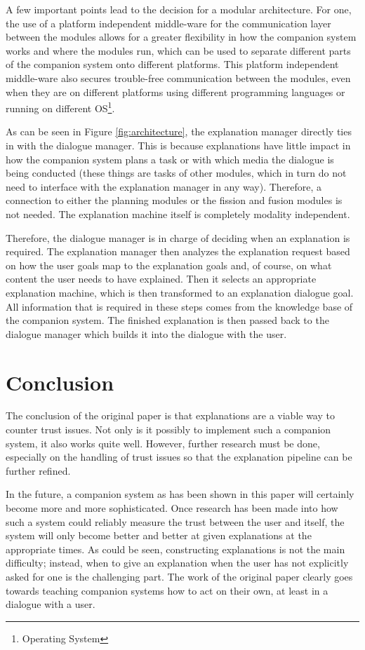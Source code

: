 \documentclass[a4paper]{article}
\begin{document}
A few important points lead to the decision for a modular architecture. For one, the use of a platform independent middle-ware for the communication layer between the modules allows for a greater flexibility in how the companion system works and where the modules run, which can be used to separate different parts of the companion system onto different platforms. This platform independent middle-ware also secures trouble-free communication between the modules, even when they are on different platforms using different programming languages or running on different OS\footnote{Operating System}.

As can be seen in Figure \ref{fig:architecture}, the explanation manager directly ties in with the dialogue manager. This is because explanations have little impact in how the companion system plans a task or with which media the dialogue is being conducted (these things are tasks of other modules, which in turn do not need to interface with the explanation manager in any way). Therefore, a connection to either the planning modules or the fission and fusion modules is not needed. The explanation machine itself is completely modality independent.

Therefore, the dialogue manager is in charge of deciding when an explanation is required. The explanation manager then analyzes the explanation request based on how the user goals map to the explanation goals and, of course, on what content the user needs to have explained. Then it selects an appropriate explanation machine, which is then transformed to an explanation dialogue goal. All information that is required in these steps comes from the knowledge base of the companion system. The finished explanation is then passed back to the dialogue manager which builds it into the dialogue with the user.

\section{Conclusion}

The conclusion of the original paper is that explanations are a viable way to counter trust issues. Not only is it possibly to implement such a companion system, it also works quite well. However, further research must be done, especially on the handling of trust issues so that the explanation pipeline can be further refined.

In the future, a companion system as has been shown in this paper will certainly become more and more sophisticated. Once research has been made into how such a system could reliably measure the trust between the user and itself, the system will only become better and better at given explanations at the appropriate times. As could be seen, constructing explanations is not the main difficulty; instead, when to give an explanation when the user has not explicitly asked for one is the challenging part. The work of the original paper clearly goes towards teaching companion systems how to act on their own, at least in a dialogue with a user.

\newpage

\end{document}
